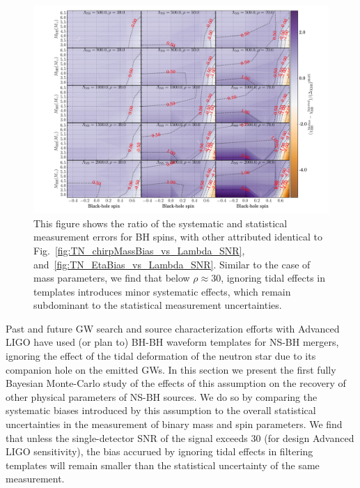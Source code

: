 \documentclass[aps,prd,amsmath,floats,floatfix, twocolumn,
superscriptaddress,nofootinbib,showpacs]{revtex4-1}
\begin{document}
\begin{figure}
\centering
\includegraphics[trim={1.3cm 0 0 0},width=2.\columnwidth]{plots/TNChiBHBiasesOverCIWidths_CI90_0_Lambda_SNR_linear}
\caption{This figure shows the ratio of the systematic and statistical
measurement errors for BH spins, with other attributed identical to 
Fig.~\ref{fig:TN_chirpMassBias_vs_Lambda_SNR}, and~\ref{fig:TN_EtaBias_vs_Lambda_SNR}.
Similar to the case of mass parameters, we find that below
$\rho\approx 30$, ignoring tidal effects in templates introduces minor systematic effects,
which remain subdominant to the statistical measurement uncertainties.
}
\label{fig:TN_BHspinBias_vs_Lambda_SNR}
\end{figure}
% 
% 
Past and future GW search and source characterization efforts with Advanced LIGO
have used (or plan to) BH-BH waveform templates for NS-BH mergers, ignoring
the effect of the tidal deformation of the neutron star due to its companion hole
on the emitted GWs. In this section we present the first fully Bayesian Monte-Carlo
study of the effects of this assumption on the recovery of other physical parameters
of NS-BH sources. We do so by comparing the systematic biases introduced by this 
assumption to the overall statistical uncertainties in the measurement of binary 
mass and spin parameters. We find that unless the single-detector SNR of the signal
exceeds $30$ (for design Advanced LIGO sensitivity), the bias accurued by ignoring
tidal effects in filtering templates will remain smaller than the statistical 
uncertainty of the same measurement.
\end{document}
